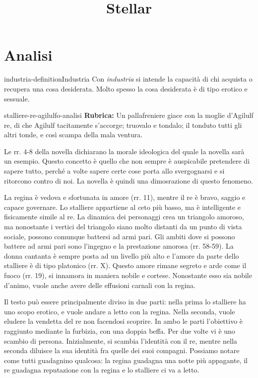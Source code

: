 \documentclass[preview]{standalone}
\begin{document}
\title{Stellar}
\genpage

\section{Analisi}

\begin{snippetdefinition}{industria-definition}{Industria}
    Con \textit{industria} si intende la capacità di chi acquista o recupera una cosa desiderata.
    Molto spesso la cosa desiderata è di tipo erotico e sessuale.
\end{snippetdefinition}

\begin{snippet}{stalliere-re-agilulfo-analisi}
    \textbf{Rubrica:} Un pallafreniere giace con la moglie d'Agilulf re, di che Agilulf tacitamente s'accorge; truovalo e tondalo; il tonduto tutti gli altri tonde, e così scampa della mala ventura.

    Le rr. 4-8 della novella dichiarano la morale ideologica del quale la novella sarà un esempio.
    Questo concetto è quello che non sempre è auspicabile pretendere di sapere tutto,
    perché a volte sapere certe cose porta allo svergognarsi e si ritorcono contro di noi.
    La novella è quindi una dimosrazione di questo fenomeno.
    
    La regina è vedova e sfortunata in amore (rr. 11),
    mentre il re è bravo, saggio e capace governare.
    Lo stalliere appartiene al ceto più basso, ma è intelligente e fisicamente simile al re.
    La dinamica dei personaggi crea un triangolo amoroso, ma nonostante
    i vertici del triangolo siano molto distanti da un punto di vista sociale, possono comunque battersi ad armi pari.
    Gli ambiti dove si possono battere ad armi pari sono l'ingegno e la prestazione amorosa (rr. 58-59).
    La donna cantanta è sempre posta ad un livello più alto e l'amore da parte dello stalliere
    è di tipo platonico (rr. X).
    Questo amore rimane segreto e arde come il fuoco (rr. 19), si innamora in maniera nobile e
    cortese. Nonostante esso sia nobile d'animo, vuole anche avere delle effusioni carnali con la regina.
    
    Il testo può essere principalmente diviso in due parti: nella prima lo stalliere
    ha uno scopo erotico, e vuole andare a letto con la regina. Nella seconda,
    vuole eludere la vendetta del re non facendosi scoprire.
    In ambo le parti l'obiettivo è raggiunto mediante la furbizia, con una doppia beffa.
    Per due volte vi è uno scambio di persona. Inizialmente, si scambia l'identità con il re, mentre
    nella seconda diluisce la sua identità fra quelle dei suoi compagni.
    Possiamo notare come tutti guadagnino qualcosa: la regina guadagna una notte più appagante,
    il re guadagna reputazione con la regina e lo stalliere ci va a letto.
    

\end{snippet}
\end{document}
